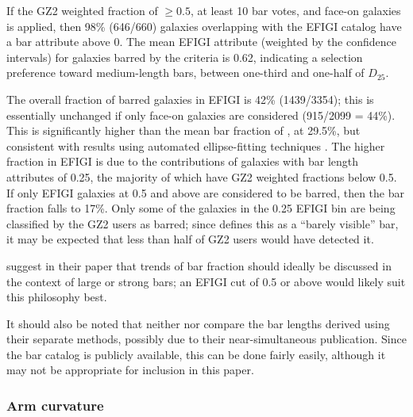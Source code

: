 \documentclass[useAMS,usenatbib]{mn2e}
\begin{document}
If the \citet{mas11c} GZ2 weighted fraction of $\geq0.5$, at least 10 bar votes, and face-on galaxies is applied, then 98\% (646/660) galaxies overlapping with the EFIGI catalog have a bar attribute above 0. The mean EFIGI attribute (weighted by the confidence intervals) for galaxies barred by the \citet{mas11c} criteria is 0.62, indicating a selection preference toward medium-length bars, between one-third and one-half of $D_{25}$. 

The overall fraction of barred galaxies in EFIGI is 42\% (1439/3354); this is essentially unchanged if only face-on galaxies are considered (915/2099 = 44\%). This is significantly higher than the mean bar fraction of \citet{mas11c}, at 29.5\%, but consistent with results using automated ellipse-fitting techniques \citep{bar08,agu09}. The higher fraction in EFIGI is due to the contributions of galaxies with bar length attributes of 0.25, the majority of which have GZ2 weighted fractions below 0.5. If only EFIGI galaxies at 0.5 and above are considered to be barred, then the bar fraction falls to 17\%. Only some of the galaxies in the 0.25 EFIGI bin are being classified by the GZ2 users as barred; since \citet{bai11} defines this as a ``barely visible'' bar, it may be expected that less than half of GZ2 users would have detected it. 

\citet{mas11c} suggest in their paper that trends of bar fraction should ideally be discussed in the context of large or strong bars; an EFIGI cut of 0.5 or above would likely suit this philosophy best. 

It should also be noted that neither \citet{hoy11} nor \citet{bai11} compare the bar lengths derived using their separate methods, possibly due to their near-simultaneous publication. Since the bar catalog is publicly available, this can be done fairly easily, although it may not be appropriate for inclusion in this paper. 

\subsubsection{Arm curvature}
\end{document}
